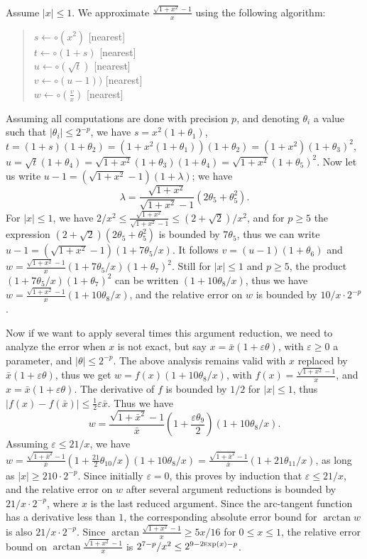 \documentclass[12pt]{amsart}
\def\Exp{{\rm \textsc exp}}
\begin{document}
Assume $|x| \leq 1$. 
We approximate $\frac{\sqrt{1+x^2}-1}{x}$ using the following algorithm:
\begin{quote}
$s \leftarrow \circ(x^2)$ [nearest] \\
$t \leftarrow \circ(1+s)$ [nearest] \\
$u \leftarrow \circ(\sqrt{t})$ [nearest] \\
$v \leftarrow \circ(u-1))$ [nearest] \\
$w \leftarrow \circ(\frac{v}{x})$ [nearest]
\end{quote}
Assuming all computations are done with precision $p$, and denoting
$\theta_i$ a value such that $|\theta_i| \leq 2^{-p}$, we have
$s = x^2 (1+\theta_1)$, $t = (1+s) (1+\theta_2) =
(1 + x^2 (1+\theta_1)) (1+\theta_2) = (1+x^2) (1+\theta_3)^2$,
$u = \sqrt{t} (1+\theta_4) = \sqrt{1+x^2} (1+\theta_3) (1 + \theta_4)
= \sqrt{1+x^2} (1 + \theta_5)^2$.
Now let us write $u - 1 = (\sqrt{1+x^2}-1) (1 + \lambda)$; we have
\[ \lambda = \frac{\sqrt{1+x^2}}{\sqrt{1+x^2}-1} (2 \theta_5 + \theta_5^2). \]
For $|x| \leq 1$, we have $2/x^2 \leq \frac{\sqrt{1+x^2}}{\sqrt{1+x^2}-1}
\leq (2+\sqrt{2})/x^2$, and for $p \geq 5$ the expression
$(2+\sqrt{2}) (2 \theta_5 + \theta_5^2)$ is bounded by $7 \theta_5$, thus we
can write $u - 1 = (\sqrt{1+x^2}-1) (1 + 7 \theta_5/x)$.
It follows $v = (u-1) (1 + \theta_6)$ and
$w = \frac{\sqrt{1+x^2}-1}{x} (1 + 7 \theta_5/x) (1 + \theta_7)^2$.
Still for $|x| \leq 1$ and $p \geq 5$, the product
$(1 + 7 \theta_5/x) (1 + \theta_7)^2$ can be written
$(1 + 10 \theta_8/x)$, thus we have
$w = \frac{\sqrt{1+x^2}-1}{x} (1 + 10 \theta_8/x)$, and the relative
error on $w$ is bounded by $10/x \cdot 2^{-p}$.

Now if we want to apply several times this argument reduction, we need to
analyze the error when $x$ is not exact, but say $x = \bar{x} (1 + \varepsilon
\theta)$, with $\varepsilon \geq 0$ a parameter, and $|\theta| \leq 2^{-p}$.
The above analysis remains valid with $x$ replaced by $\bar{x} (1 + \varepsilon
\theta)$, thus we get $w = f(x) (1 + 10 \theta_8/x)$,
with $f(x) = \frac{\sqrt{1+x^2}-1}{x}$, and $x = \bar{x} (1 + \varepsilon
\theta)$. The derivative of $f$ is bounded by $1/2$ for $|x| \leq 1$, thus
$|f(x) - f(\bar{x})| \leq \frac{1}{2} \varepsilon \bar{x}$. Thus we have
\[ w = \frac{\sqrt{1+\bar{x}^2}-1}{\bar{x}} (1 + \frac{\varepsilon\theta_9}{2})
(1 + 10 \theta_8/x). \]
Assuming $\varepsilon \leq 21/x$, we have
$w = \frac{\sqrt{1+\bar{x}^2}-1}{\bar{x}} (1 + \frac{21}{2} \theta_{10}/x)
(1 + 10 \theta_8/x) = \frac{\sqrt{1+\bar{x}^2}-1}{\bar{x}}
(1 + 21 \theta_{11}/x)$, as long as $|x| \geq 210 \cdot 2^{-p}$.
Since initially $\varepsilon=0$, this proves by induction that
$\varepsilon \leq 21/x$, and the relative error on $w$ after several
argument reductions is bounded by $21/x \cdot 2^{-p}$, where $x$ is the last
reduced argument.
Since the arc-tangent function has a derivative less than $1$,
the corresponding absolute error bound for
$\arctan w$ is also $21/x \cdot 2^{-p}$.
Since $\arctan\frac{\sqrt{1+x^2}-1}{x} \geq 5x/16$ for $0 \leq x \leq 1$,
the relative error bound on $\arctan\frac{\sqrt{1+x^2}-1}{x}$ is
$2^{7-p}/x^2 \leq 2^{9-2\Exp(x)-p}$.
\end{document}
